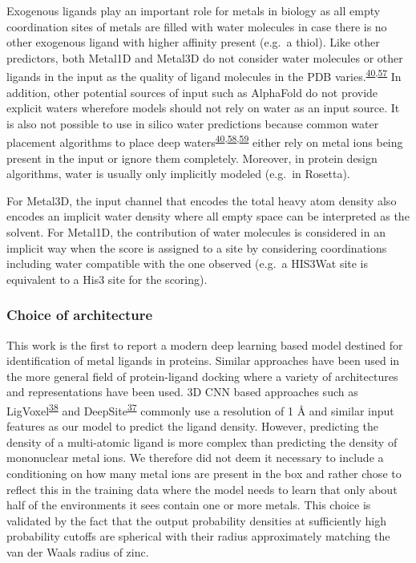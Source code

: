 \documentclass[  ASAPversion,
  ,
  9pt]{elife}
\begin{document}
Exogenous ligands play an important role for metals in biology as all empty coordination sites of metals are filled with water molecules in case there is no other exogenous ligand with higher affinity present (e.g.~a thiol). Like other predictors, both Metal1D and Metal3D do not consider water molecules or other ligands in the input as the quality of ligand molecules in the PDB varies.\textsuperscript{\protect\hyperlink{ref-9UNjBvCL}{40},\protect\hyperlink{ref-NifwNdQd}{57}} In addition, other potential sources of input such as AlphaFold do not provide explicit waters wherefore models should not rely on water as an input source. It is also not possible to use in silico water predictions because common water placement algorithms to place deep waters\textsuperscript{\protect\hyperlink{ref-9UNjBvCL}{40},\protect\hyperlink{ref-10C4imKQR}{58},\protect\hyperlink{ref-izkvZoLX}{59}} either rely on metal ions being present in the input or ignore them completely. Moreover, in protein design algorithms, water is usually only implicitly modeled (e.g.~in Rosetta).

For Metal3D, the input channel that encodes the total heavy atom density also encodes an implicit water density where all empty space can be interpreted as the solvent. For Metal1D, the contribution of water molecules is considered in an implicit way when the score is assigned to a site by considering coordinations including water compatible with the one observed (e.g.~a HIS3Wat site is equivalent to a His3 site for the scoring).

\hypertarget{choice-of-architecture}{%
\subsubsection{Choice of architecture}\label{choice-of-architecture}}

This work is the first to report a modern deep learning based model destined for identification of metal ligands in proteins. Similar approaches have been used in the more general field of protein-ligand docking where a variety of architectures and representations have been used. 3D CNN based approaches such as LigVoxel\textsuperscript{\protect\hyperlink{ref-mVGaXlum}{38}} and DeepSite\textsuperscript{\protect\hyperlink{ref-Gq7n6vhH}{37}} commonly use a resolution of 1 Å and similar input features as our model to predict the ligand density. However, predicting the density of a multi-atomic ligand is more complex than predicting the density of mononuclear metal ions. We therefore did not deem it necessary to include a conditioning on how many metal ions are present in the box and rather chose to reflect this in the training data where the model needs to learn that only about half of the environments it sees contain one or more metals. This choice is validated by the fact that the output probability densities at sufficiently high probability cutoffs are spherical with their radius approximately matching the van der Waals radius of zinc.
\end{document}
